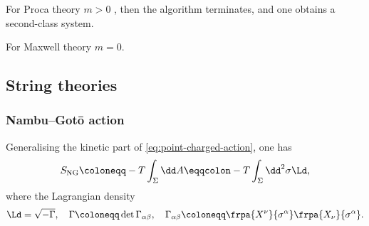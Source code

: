 \documentclass[a4paper,11pt]{article}
\begin{document}
For Proca theory $m > 0$ , then the algorithm terminates, and one obtains a 
second-class system.

For Maxwell theory $m = 0$.














\subsection{String theories}

\subsubsection*{Nambu--Gotō action}

Generalising the kinetic part of \eqref{eq:point-charged-action}, one has
\begin{equation}
S_\text{NG} \coloneqq -T \int_\Sigma \dd A
\eqqcolon -T \int_\Sigma\dd^2\sigma \Ld,
\end{equation}
where the Lagrangian density
\begin{equation}
\Ld = \sqrt{-\Gamma},\quad
\Gamma \coloneqq \det \Gamma_{\alpha\beta},\quad
\Gamma_{\alpha\beta} \coloneqq \frpa{X^\nu}{\sigma^\alpha} 
\frpa{X_\nu}{\sigma^\alpha}.
\end{equation}
\end{document}

